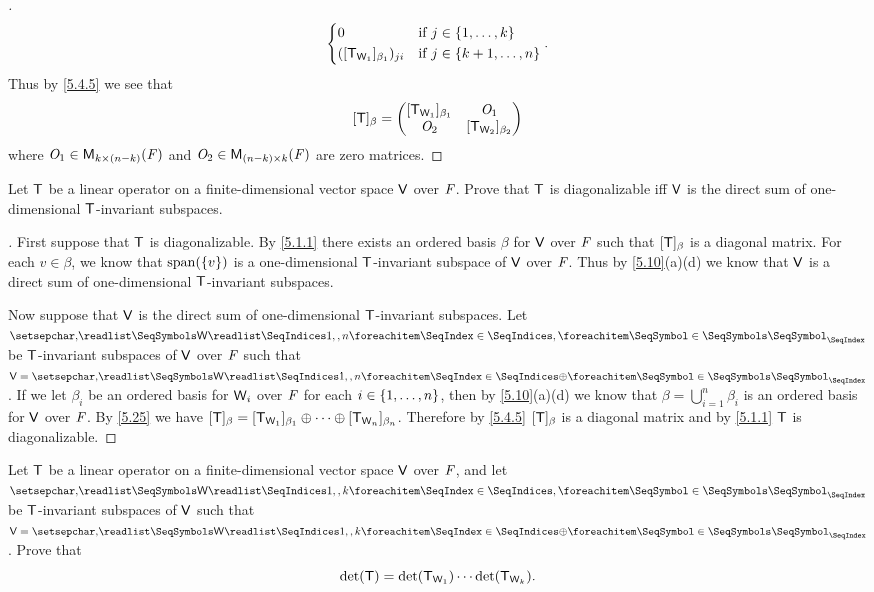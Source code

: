 \begin{proof}[]
\begin{align*}
\begin{dcases}
                                        0                             & \text{if } j \in \left\lbrace1, \dots, k\right\rbrace     \\
                                        ([\mathsf{T}_{\mathsf{W}_1}]_{\beta_1})_{j i} & \text{if } j \in \left\lbrace k + 1, \dots, n\right\rbrace
                                      \end{dcases}.
  \end{align*}
  Thus by \cref{5.4.5} we see that
  \[
    [\mathsf{T}]_{\beta} = \begin{pmatrix}
      [\mathsf{T}_{\mathsf{W}_1}]_{\beta_1} & \mathit{O}_1                 \\
      \mathit{O}_2                 & [\mathsf{T}_{\mathsf{W}_2}]_{\beta_2}
    \end{pmatrix}
  \]
  where \(\mathit{O}_1 \in \mathsf{M}_{{k} \times (n - k)}({\mathit{F}})\) and \(\mathit{O}_2 \in \mathsf{M}_{{(n - k)} \times k}({\mathit{F}})\) are zero matrices.
\end{proof}

\setcounter{ex}{35}
\begin{ex}\label{ex:5.4.36}
  Let \(\mathsf{T}\) be a linear operator on a finite-dimensional vector space \(\mathsf{V}\) over \(\mathit{F}\).
  Prove that \(\mathsf{T}\) is diagonalizable iff \(\mathsf{V}\) is the direct sum of one-dimensional \(\mathsf{T}\)-invariant subspaces.
\end{ex}

\begin{proof}[]
  First suppose that \(\mathsf{T}\) is diagonalizable.
  By \cref{5.1.1} there exists an ordered basis \(\beta\) for \(\mathsf{V}\) over \(\mathit{F}\) such that \([\mathsf{T}]_{\beta}\) is a diagonal matrix.
  For each \(v \in \beta\), we know that \(\spn{\set{v}}\) is a one-dimensional \(\mathsf{T}\)-invariant subspace of \(\mathsf{V}\) over \(\mathit{F}\).
  Thus by \cref{5.10}(a)(d) we know that \(\mathsf{V}\) is a direct sum of one-dimensional \(\mathsf{T}\)-invariant subspaces.

  Now suppose that \(\mathsf{V}\) is the direct sum of one-dimensional \(\mathsf{T}\)-invariant subspaces.
  Let \(\seq{\W}{1,,n}\) be \(\mathsf{T}\)-invariant subspaces of \(\mathsf{V}\) over \(\mathit{F}\) such that \(\V = \seq[\oplus]{\W}{1,,n}\).
  If we let \(\beta_i\) be an ordered basis for \(\mathsf{W}_i\) over \(\mathit{F}\) for each \(i \in \left\lbrace1, \dots, n\right\rbrace\), then by \cref{5.10}(a)(d) we know that \(\beta = \bigcup_{i = 1}^n \beta_i\) is an ordered basis for \(\mathsf{V}\) over \(\mathit{F}\).
  By \cref{5.25} we have \([\mathsf{T}]_{\beta} = [\mathsf{T}_{\mathsf{W}_1}]_{\beta_1} \oplus \cdots \oplus [\mathsf{T}_{\mathsf{W}_n}]_{\beta_n}\).
  Therefore by \cref{5.4.5} \([\mathsf{T}]_{\beta}\) is a diagonal matrix and by \cref{5.1.1} \(\mathsf{T}\) is diagonalizable.
\end{proof}

\begin{ex}\label{ex:5.4.37}
  Let \(\mathsf{T}\) be a linear operator on a finite-dimensional vector space \(\mathsf{V}\) over \(\mathit{F}\), and let \(\seq{\W}{1,,k}\) be \(\mathsf{T}\)-invariant subspaces of \(\mathsf{V}\) such that \(\V = \seq[\oplus]{\W}{1,,k}\).
  Prove that
  \[
    \det(\mathsf{T}) = \det(\mathsf{T}_{\mathsf{W}_1}) \cdots \det(\mathsf{T}_{\mathsf{W}_k}).
  \]
\end{ex}

